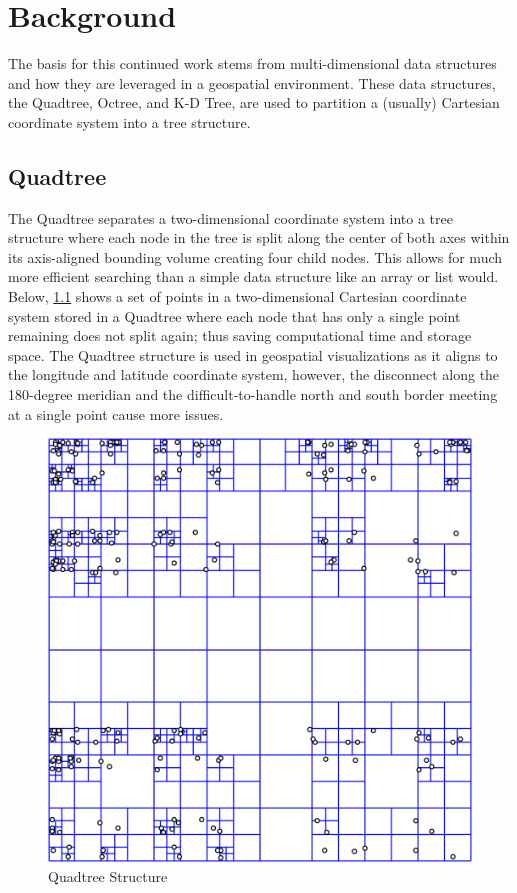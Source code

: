 \chapter{Background}

The basis for this continued work stems from multi-dimensional data structures
and how they are leveraged in a geospatial environment. These data structures,
the Quadtree, Octree, and K-D Tree, are used to partition a (usually) Cartesian
coordinate system into a tree structure.

\section{Quadtree}

The Quadtree separates a two-dimensional coordinate system into a tree structure
where each node in the tree is split along the center of both axes within its
axis-aligned bounding volume creating four child nodes. This allows for much
more efficient searching than a simple data structure like an array or list
would. Below, \ref{fig:quadtree} shows a set of points in a two-dimensional
Cartesian coordinate system stored in a Quadtree where each node that has only a
single point remaining does not split again; thus saving computational time and
storage space. The Quadtree structure is used in geospatial visualizations as it
aligns to the longitude and latitude coordinate system, however, the disconnect
along the 180-degree meridian and the difficult-to-handle north and south border
meeting at a single point cause more issues.

\begin{figure}[htb]
\begin{center}
\includegraphics[width=.5\linewidth]{images/Point_quadtree.png}
\end{center}
\caption{Quadtree Structure {\cite{10_eppstein_2005}}}
\label{fig:quadtree}
\end{figure}

